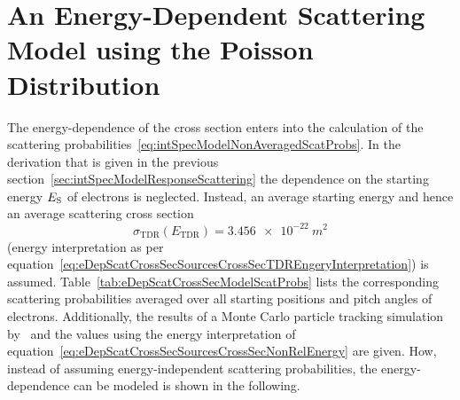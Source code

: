 \section{An Energy-Dependent Scattering Model using the Poisson Distribution}
\label{sec:eDepScatCrossSecModelPoisson}
The energy-dependence of the cross section enters into the calculation of the scattering probabilities~\eqref{eq:intSpecModelNonAveragedScatProbs}. In the derivation that is given in the previous section~\ref{sec:intSpecModelResponseScattering} the dependence on the starting energy $E_\mathrm{S}$ of electrons is neglected. Instead, an average starting energy and hence an average scattering cross section
\begin{equation}
	\sigma_\mathrm{TDR}(E_\mathrm{TDR})=\SI{3.456e-22}{m^2}
\end{equation}  (energy interpretation as per equation~\ref{eq:eDepScatCrossSecSourcesCrossSecTDREngeryInterpretation}) is assumed. Table~\ref{tab:eDepScatCrossSecModelScatProbs} lists the corresponding scattering probabilities averaged over all starting positions and pitch angles of electrons. Additionally, the results of a Monte Carlo particle tracking simulation by~\cite{Groh2015} and the values using the energy interpretation of equation~\eqref{eq:eDepScatCrossSecSourcesCrossSecNonRelEnergy} are given. How, instead of assuming energy-independent scattering probabilities, the energy-dependence can be modeled is shown in the following.
